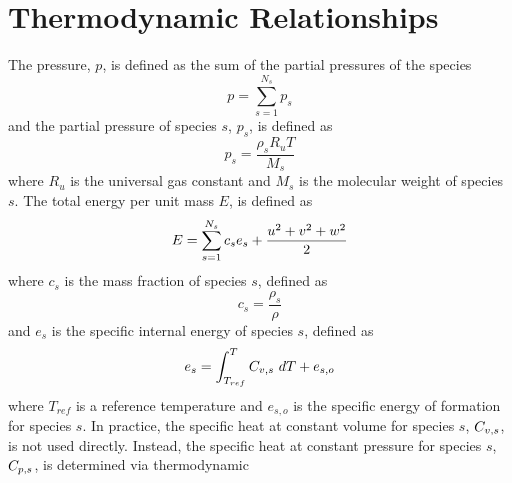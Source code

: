 \section{Thermodynamic Relationships}

The pressure, $p$, is defined as the sum of the partial pressures of the species
\begin{equation}
  p = \sum_{s=1}^{N_s} p_s
  \label{pressure-def}
\end{equation}
and the partial pressure of species $s$, $p_s$, is defined as
\begin{equation}
  p_s = \frac{\rho_s R_u T}{M_s}
  \label{partial-pressure-def}
\end{equation}
where $R_u$ is the universal gas constant and $M_s$ is the molecular weight of
species $s$.  The total energy per unit mass $E$, is defined as
\begin{equation} 
  E = \sum\limits_{s=1}^{N_s}{c_s e_s} + \frac{u^2+v^2+w^2}{2} 
  \label{tot-energy-def}
\end{equation}
where $c_s$ is the mass fraction of species $s$, defined as
\begin{equation}
  c_s = \frac{\rho_s}{\rho}
  \label{mass-frac-def}
\end{equation}
and $e_s$ is the specific internal energy of species $s$, defined as
\begin{equation}
  e_s = \int_{T_{ref}}^{T} \cvs \ dT + e_{s,o}
  \label{int-energy-def}
\end{equation}
where $T_{ref}$ is a reference temperature and $e_{s,o}$ is the specific
energy of formation for species $s$.  In practice, the specific heat at constant
volume for species $s$, $C_{v,s}$, is not used directly. Instead, the specific heat
at constant pressure for species $s$, $C_{p,s}$, is determined via thermodynamic
